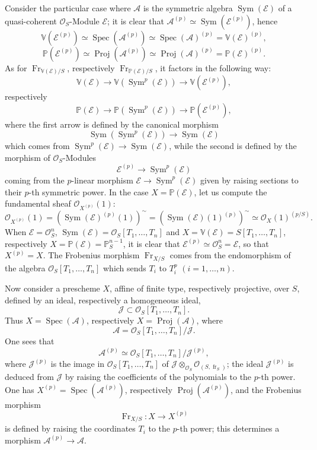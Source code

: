 \documentclass[11pt]{article}
\DeclareMathOperator{\Spec}{Spec}
\providecommand{\OO}{\mathcal{O}}
\providecommand{\cE}{\mathcal E}
\providecommand{\Spec}{\operatorname{Spec}}
\providecommand{\Sym}{\operatorname{Sym}}
\providecommand{\Spec}{\operatorname{Spec}}
\providecommand{\Spec}{\operatorname{Spec}}
\providecommand{\fr}{\operatorname{fr}}
\providecommand{\Fr}{\operatorname{Fr}}
\providecommand{\Proj}{\operatorname{Proj}}
\providecommand{\Sym}{\operatorname{Sym}}
\providecommand{\JJ}{\mathcal J}
\providecommand{\Fr}{\operatorname{Fr}}
\providecommand{\fr}{\operatorname{fr}}
\providecommand{\Spec}{\operatorname{Spec}}
\begin{document}
Consider the particular case where $\mathcal{A}$ is the symmetric algebra $\Sym(\cE)$ of a quasi-coherent $\OO_S$-Module $\cE$; it is clear that $\mathcal{A}^{(p)}\simeq\Sym(\cE^{(p)})$, hence
\[
\mathbb V(\cE^{(p)})\simeq\Spec(\mathcal{A}^{(p)})\simeq\Spec(\mathcal{A})^{(p)}=\mathbb V(\cE)^{(p)},
\]
\[
\mathbb P(\cE^{(p)})\simeq\Proj(\mathcal{A}^{(p)})\simeq\Proj(\mathcal{A})^{(p)}=\mathbb P(\cE)^{(p)}.
\]
As for $\Fr_{\mathbb V(\cE)/S}$, respectively $\Fr_{\mathbb P(\cE)/S}$, it factors in the following way:
\[
\mathbb V(\cE)\longrightarrow \mathbb V(\Sym^p(\cE))\longrightarrow \mathbb V(\cE^{(p)}),
\]
respectively
\[
\mathbb P(\cE)\longrightarrow \mathbb P(\Sym^p(\cE))\longrightarrow \mathbb P(\cE^{(p)}),
\]
where the first arrow is defined by the canonical morphism
\[
\Sym(\Sym^p(\cE))\longrightarrow \Sym(\cE)
\]
which comes from $\Sym^p(\cE)\to\Sym(\cE)$, while the second is defined by the morphism of $\OO_S$-Modules
\[
\cE^{(p)}\longrightarrow \Sym^p(\cE)
\]
coming from the $p$-linear morphism $\cE\to\Sym^p(\cE)$ given by raising sections to their $p$-th symmetric power. In the case $X=\mathbb P(\cE)$, let us compute the fundamental sheaf $\OO_{X^{(p)}}(1)$:
\[
\OO_{X^{(p)}}(1)=(\Sym(\cE)^{(p)}(1))^{\sim}
=(\Sym(\cE)(1)^{(p)})^{\sim}
\simeq \OO_X(1)^{(p/S)}.
\]
When $\cE=\OO_S^n$, $\Sym(\cE)=\OO_S[T_1,\ldots,T_n]$ and $X=\mathbb V(\cE)=S[T_1,\ldots,T_n]$, respectively $X=\mathbb P(\cE)=\mathbb P_S^{n-1}$, it is clear that $\cE^{(p)}\simeq\OO_S^n=\cE$, so that $X^{(p)}=X$. The Frobenius morphism $\Fr_{X/S}$ comes from the endomorphism of the algebra $\OO_S[T_1,\ldots,T_n]$ which sends $T_i$ to $T_i^p$ $(i=1,\ldots,n)$.

Now consider a prescheme $X$, affine of finite type, respectively projective, over $S$, defined by an ideal, respectively a homogeneous ideal,
\[
\JJ\subset \OO_S[T_1,\ldots,T_n].
\]
Thus $X=\Spec(\mathcal{A})$, respectively $X=\Proj(\mathcal{A})$, where
\[
\mathcal{A}=\OO_S[T_1,\ldots,T_n]/\JJ.
\]
One sees that
\[
\mathcal{A}^{(p)}\simeq \OO_S[T_1,\ldots,T_n]/\JJ^{(p)},
\]
where $\JJ^{(p)}$ is the image in $\OO_S[T_1,\ldots,T_n]$ of $\JJ\otimes_{\OO_S}\OO_{(S,\fr_S)}$; the ideal $\JJ^{(p)}$ is deduced from $\JJ$ by raising the coefficients of the polynomials to the $p$-th power. One has $X^{(p)}=\Spec(\mathcal{A}^{(p)})$, respectively $\Proj(\mathcal{A}^{(p)})$, and the Frobenius morphism
\[
\Fr_{X/S}:X\longrightarrow X^{(p)}
\]
is defined by raising the coordinates $T_i$ to the $p$-th power; this determines a morphism $\mathcal{A}^{(p)}\to\mathcal{A}$.
\end{document}
